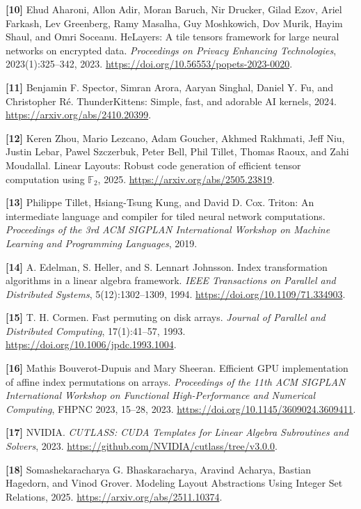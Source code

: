 \noindent\textbf{[10]} Ehud Aharoni, Allon Adir, Moran Baruch, Nir Drucker, Gilad Ezov,
Ariel Farkash, Lev Greenberg, Ramy Masalha, Guy Moshkowich, Dov Murik,
Hayim Shaul, and Omri Soceanu. HeLayers: A tile tensors framework for large
neural networks on encrypted data. \emph{Proceedings on Privacy Enhancing
Technologies}, 2023(1):325--342, 2023.
\url{https://doi.org/10.56553/popets-2023-0020}.

\noindent\textbf{[11]} Benjamin F. Spector, Simran Arora, Aaryan Singhal, Daniel Y. Fu, and
Christopher R\'e. ThunderKittens: Simple, fast, and adorable AI kernels, 2024.
\url{https://arxiv.org/abs/2410.20399}.

\noindent\textbf{[12]} Keren Zhou, Mario Lezcano, Adam Goucher, Akhmed Rakhmati, Jeff Niu,
Justin Lebar, Pawel Szczerbuk, Peter Bell, Phil Tillet, Thomas Raoux,
and Zahi Moudallal. Linear Layouts: Robust code generation of efficient
tensor computation using $\mathbb{F}_2$, 2025.
\url{https://arxiv.org/abs/2505.23819}.

\noindent\textbf{[13]} Philippe Tillet, Hsiang-Tsung Kung, and David D. Cox. Triton: An intermediate
language and compiler for tiled neural network computations.
\emph{Proceedings of the 3rd ACM SIGPLAN International Workshop on Machine
Learning and Programming Languages}, 2019.

\noindent\textbf{[14]} A. Edelman, S. Heller, and S. Lennart Johnsson. Index transformation algorithms
in a linear algebra framework. \emph{IEEE Transactions on Parallel and
Distributed Systems}, 5(12):1302--1309, 1994.
\url{https://doi.org/10.1109/71.334903}.

\noindent\textbf{[15]} T. H. Cormen. Fast permuting on disk arrays. \emph{Journal of Parallel and
Distributed Computing}, 17(1):41--57, 1993.
\url{https://doi.org/10.1006/jpdc.1993.1004}.

\noindent\textbf{[16]} Mathis Bouverot-Dupuis and Mary Sheeran. Efficient GPU implementation of affine
index permutations on arrays. \emph{Proceedings of the 11th ACM SIGPLAN
International Workshop on Functional High-Performance and Numerical Computing},
FHPNC 2023, 15--28, 2023. \url{https://doi.org/10.1145/3609024.3609411}.

\noindent\textbf{[17]} NVIDIA. \emph{CUTLASS: CUDA Templates for Linear Algebra Subroutines and Solvers},
2023. \url{https://github.com/NVIDIA/cutlass/tree/v3.0.0}.

\noindent\textbf{[18]} Somashekaracharya G. Bhaskaracharya, Aravind Acharya, Bastian Hagedorn,
and Vinod Grover. Modeling Layout Abstractions Using Integer Set Relations, 2025.
\url{https://arxiv.org/abs/2511.10374}.

